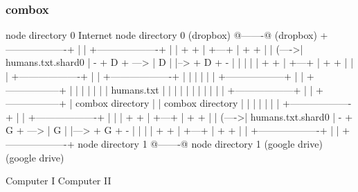 \begin{frame}[fragile]
  \frametitle{combox}

  {\tiny
  \begin{semiverbatim}

         node directory 0                Internet              node directory 0
         (dropbox)                       @-------@             (dropbox)
        +-------------------+            |       |            +-------------------+
        |                   |    + +     | +---+ |     + +    |                   |
  (---->| humans.txt.shard0 | - + D + ---> | D | |--> + D + - |                   |
  |     |                   |    + +     | +---+ |     + +    |                   |
  |     +-------------------+            |       |            +-------------------+
  |                                      |       |
  |                                      |       |
 +------------------+                    |       |                        +-----------------+
 |                  |                    |       |                        |                 |
 |  humans.txt      |                    |       |                        |                 |
 |                  |                    |       |                        |                 |
 +------------------+                    |       |                        +-----------------+
  |  combox directory                    |       |                      combox directory
  |                                      |       |
  |                                      |       |
  |     +-------------------+            |       |             +-------------------+
  |     |                   |    + +     | +---+ |      + +    |                   |
  (---->| humans.txt.shard0 | - + G + ---> | G | |---> + G + - |                   |
        |                   |    + +     | +---+ |      + +    |                   |
        +-------------------+            |       |             +-------------------+
         node directory 1                @-------@              node directory 1
         (google drive)                                         (google drive)

  Computer I                                                                    Computer II
  \end{semiverbatim}
  }

\end{frame}


